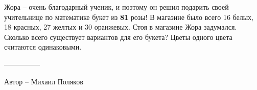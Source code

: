 \question
Жора -- очень благодарный ученик, и поэтому он решил подарить своей учительнице по математике букет из \textbf{81} розы! В магазине было всего 16 белых, 18 красных, 27 желтых и 30 оранжевых. Стоя в магазине Жора задумался. Сколько всего существует вариантов для его букета? Цветы одного цвета считаются одинаковыми.

---------------

Автор -- Михаил Поляков
